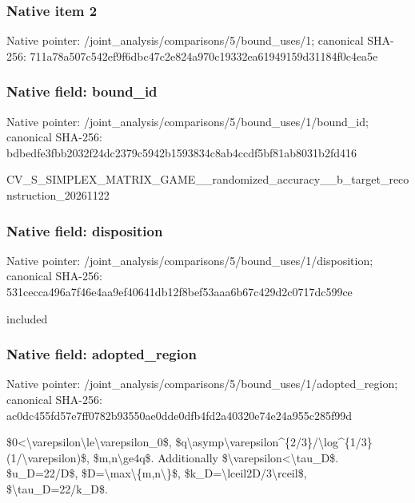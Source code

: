 \documentclass[10pt,a4paper]{article}
\begin{document}
\subsubsection{Native item 2}


Native pointer: /joint\_analysis/comparis\allowbreak{}ons/5/bound\_uses/1; canonical SHA-256: 711a78a507c542ef9f6dbc47\allowbreak{}c2e824a970c19332ea619491\allowbreak{}59d31184f0c4ea5e



\subsubsection{Native field: bound\_id}


Native pointer: /joint\_analysis/comparis\allowbreak{}ons/5/bound\_uses/1/bound\allowbreak{}\_id; canonical SHA-256: bdbedfe3fbb2032f24dc2379\allowbreak{}c5942b1593834c8ab4ccdf5b\allowbreak{}f81ab8031b2fd416


CV\_S\_SIMPLEX\_MATRIX\_GAME\allowbreak{}\_\_randomized\_accuracy\_\_b\allowbreak{}\_target\_reconstruction\_2\allowbreak{}0261122


\subsubsection{Native field: disposition}


Native pointer: /joint\_analysis/comparis\allowbreak{}ons/5/bound\_uses/1/dispo\allowbreak{}sition; canonical SHA-256: 531cecca496a7f46e4aa9ef4\allowbreak{}0641db12f8bef53aaa6b67c4\allowbreak{}29d2c0717dc599ce


included


\subsubsection{Native field: adopted\_region}


Native pointer: /joint\_analysis/comparis\allowbreak{}ons/5/bound\_uses/1/adopt\allowbreak{}ed\_region; canonical SHA-256: ac0dc455fd57e7ff0782b935\allowbreak{}50ae0dde0dfb4fd2a40320e7\allowbreak{}4e24a955c285f99d


\$0<\textbackslash{}varepsilon\textbackslash{}le\textbackslash{}varepsilon\_0\$, \$q\textbackslash{}asymp\textbackslash{}varepsilon\textasciicircum{}\{2/\allowbreak{}3\}/\textbackslash{}log\textasciicircum{}\{1/3\}(1/\textbackslash{}varepsi\allowbreak{}lon)\$, \$m,n\textbackslash{}ge4q\$. Additionally \$\textbackslash{}varepsilon<\textbackslash{}tau\_D\$. \$u\_D=22/D\$, \$D=\textbackslash{}max\textbackslash{}\{m,n\textbackslash{}\}\$, \$k\_D=\textbackslash{}lceil2D/3\textbackslash{}rceil\$, \$\textbackslash{}tau\_D=22/k\_D\$.
\end{document}
